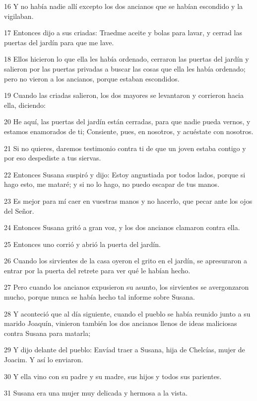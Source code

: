 \par 16 Y no había nadie allí excepto los dos ancianos que se habían escondido y la vigilaban.
\par 17 Entonces dijo a sus criadas: Traedme aceite y bolas para lavar, y cerrad las puertas del jardín para que me lave.
\par 18 Ellos hicieron lo que ella les había ordenado, cerraron las puertas del jardín y salieron por las puertas privadas a buscar las cosas que ella les había ordenado; pero no vieron a los ancianos, porque estaban escondidos.
\par 19 Cuando las criadas salieron, los dos mayores se levantaron y corrieron hacia ella, diciendo:
\par 20 He aquí, las puertas del jardín están cerradas, para que nadie pueda vernos, y estamos enamorados de ti; Consiente, pues, en nosotros, y acuéstate con nosotros.
\par 21 Si no quieres, daremos testimonio contra ti de que un joven estaba contigo y por eso despediste a tus siervas.
\par 22 Entonces Susana suspiró y dijo: Estoy angustiada por todos lados, porque si hago esto, me mataré; y si no lo hago, no puedo escapar de tus manos.
\par 23 Es mejor para mí caer en vuestras manos y no hacerlo, que pecar ante los ojos del Señor.
\par 24 Entonces Susana gritó a gran voz, y los dos ancianos clamaron contra ella.
\par 25 Entonces uno corrió y abrió la puerta del jardín.
\par 26 Cuando los sirvientes de la casa oyeron el grito en el jardín, se apresuraron a entrar por la puerta del retrete para ver qué le habían hecho.
\par 27 Pero cuando los ancianos expusieron su asunto, los sirvientes se avergonzaron mucho, porque nunca se había hecho tal informe sobre Susana.
\par 28 Y aconteció que al día siguiente, cuando el pueblo se había reunido junto a su marido Joaquín, vinieron también los dos ancianos llenos de ideas maliciosas contra Susana para matarla;
\par 29 Y dijo delante del pueblo: Envíad traer a Susana, hija de Chelcías, mujer de Joacim. Y así lo enviaron.
\par 30 Y ella vino con su padre y su madre, sus hijos y todos sus parientes.
\par 31 Susana era una mujer muy delicada y hermosa a la vista.
